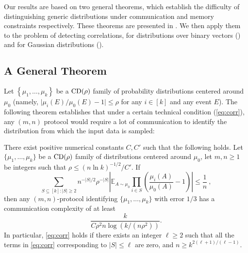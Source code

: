 Our results are based on two general theorems, which establish the difficulty of distinguishing generic distributions under communication and memory constraints respectively. These theorems are presented in . We then  apply them to the problem of detecting correlations, for distributions over binary vectors () and for Gaussian distributions ().

\subsection{A General Theorem}\label{subsec:general}

Let $\left\{\mu_1,\dots, \mu_k \right\}$ be a $\mathrm{CD}(\rho)$ family of probability distributions centered around $\mu_0$ (namely, $\lvert \mu_i(E)/\mu_0(E)-1 \rvert \le \rho$ for any $i \in [k]$ and any event $E$). The following theorem establishes that under a certain technical condition  (\eqref{eq:corr}), any $(m,n)$ protocol would require a lot of communication to identify the distribution from which the input data is sampled:

\begin{theorem} \label{thm:main}
There exist positive numerical constants $C, C'$ such that the following holds. Let $\{ \mu_1, \dots, \mu_k \}$ be a $\mathrm{CD}(\rho)$ family of distributions centered around $\mu_0$, let $m,n \ge 1$ be integers such that $\rho \le (n \ln k)^{-1/2}/C'$.
If
\begin{equation} \label{eq:corr}
\sum_{S \subseteq [k] \colon \lvert S \rvert \ge 2} n^{-\lvert S \rvert/2} \rho^{-\lvert S \rvert} \left\lvert \mathbb{E}_{A \sim \mu_0} \prod_{i\in S} \left(\frac{\mu_i(A)}{\mu_0(A)} - 1\right) \right\rvert
\le \frac{1}{n}~,
\end{equation}
then any $(m,n)$-protocol identifying $\{\mu_1, \dots, \mu_k\}$ with error $1/3$ has a communication complexity of at least
\[ \frac{k}{C \rho^2 n \log (k /(n\rho^2))}. \]
In particular, \eqref{eq:corr} holds if there exists an integer $\ell \ge 2$ such that all the terms in \eqref{eq:corr} corresponding to $\lvert S \rvert \le \ell$ are zero, and $n \ge k^{2(\ell+1)/(\ell-1)}$.
\end{theorem}

